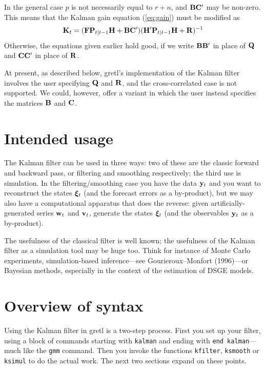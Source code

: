 \documentclass[a4paper]{article}
\newcommand{\obsvec}{\ensuremath\mathbf{y}}
\newcommand{\obsmat}{\ensuremath\mathbf{H}}
\newcommand{\obsdist}{\ensuremath\mathbf{w}}
\newcommand{\obsvar}{\ensuremath\mathbf{R}}
\newcommand{\statevec}{\ensuremath\mathbf{\bm \xi}}
\newcommand{\statemat}{\ensuremath\mathbf{F}}
\newcommand{\strdist}{\ensuremath\mathbf{v}}
\newcommand{\strvar}{\ensuremath\mathbf{Q}}
\newcommand{\statevar}{\ensuremath\mathbf{P}}
\newcommand{\gain}{\ensuremath\mathbf{K}}
\newcommand{\altstrvar}{\ensuremath\mathbf{B}}
\newcommand{\altobsvar}{\ensuremath\mathbf{C}}
\begin{document}
In the general case $p$ is not necessarily equal to $r+n$, and
$\altstrvar \altobsvar'$ may be non-zero.  This means that the
Kalman gain equation (\ref{eq:gain}) must be modified as
%
\[
\gain_t = (\statemat\statevar_{t|t-1}\obsmat + \altstrvar\altobsvar')
  (\obsmat'\statevar_{t|t-1}\obsmat + \obsvar)^{-1}
\]
%
Otherwise, the equations given earlier hold good, if we write
$\altstrvar\altstrvar'$ in place of $\strvar$ and
$\altobsvar\altobsvar'$ in place of $\obsvar$.

At present, as described below, gretl's implementation of the Kalman
filter involves the user specifying $\strvar$ and $\obsvar$, and the
cross-correlated case is not supported.  We could, however, offer a
variant in which the user instead specifies the matrices $\altstrvar$
and $\altobsvar$.


\section{Intended usage}

The Kalman filter can be used in three ways: two of these are the
classic forward and backward pass, or filtering and smoothing
respectively; the third use is simulation.  In the
filtering/smoothing case you have the data $\obsvec_t$ and you want to
reconstruct the states $\statevec_t$ (and the forecast errors as a
by-product), but we may also have a computational apparatus that does
the reverse: given artificially-generated series $\obsdist_t$ and
$\strdist_t$, generate the states $\statevec_t$ (and the observables
$\obsvec_t$ as a by-product).

The usefulness of the classical filter is well known; the usefulness
of the Kalman filter as a simulation tool may be huge too. Think for
instance of Monte Carlo experiments, simulation-based inference---see
Gourieroux--Monfort (1996)---or Bayesian methods, especially in the
context of the estimation of DSGE models.

\section{Overview of syntax}

Using the Kalman filter in gretl is a two-step process.  First you set
up your filter, using a block of commands starting with
\texttt{kalman} and ending with \texttt{end kalman}---much like the
\texttt{gmm} command.  Then you invoke the functions \texttt{kfilter},
\texttt{ksmooth} or \texttt{ksimul} to do the actual work.  The next
two sections expand on these points.
\end{document}

